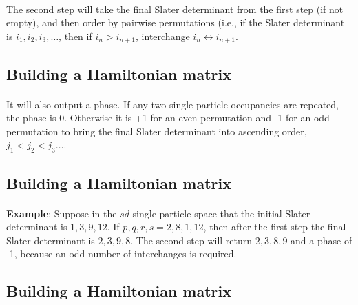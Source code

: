 \documentclass[%
oneside,                 %
final,                   %
10pt]{article}
\begin{document}
\paragraph{}
The second step will take the final Slater determinant 
from the first step (if not empty),
and then order by pairwise permutations (i.e., if the Slater determinant is
$i_1, i_2, i_3, \ldots$, then if $i_n > i_{n+1}$, interchange 
$i_n \leftrightarrow i_{n+1}$.



\subsection*{Building a Hamiltonian matrix}

\paragraph{}

It will also output a phase.  If any two single-particle occupancies are repeated, 
the phase is
0.  Otherwise it is +1 for an even permutation and -1 for an odd permutation to 
bring the final
Slater determinant into ascending order, $j_1 < j_2 < j_3 \ldots$.



\subsection*{Building a Hamiltonian matrix}

\paragraph{}
\textbf{Example}: Suppose in the $sd$ single-particle space that the initial 
Slater determinant
is $1,3,9,12$. If $p,q,r,s = 2,8,1,12$, then after the first step the final Slater determinant
is $2,3,9,8$.  The second step will return $2,3,8,9$ and a phase of -1, 
because an odd number  of interchanges is required.



\subsection*{Building a Hamiltonian matrix}

\end{document}
